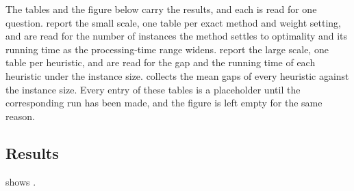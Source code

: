 \documentclass[12pt]{article}
\let\origsubsection\subsection
\renewcommand{\subsection}{\FloatBarrier\origsubsection}
\begin{document}
\begin{sloppypar}
The tables and the figure below carry the results, and each is read for one question.
 report the small
scale, one table per exact method and weight setting, and are read for the number
of instances the method settles to optimality and its running time as the processing-time range
widens.  report the large
scale, one table per heuristic, and are read for the gap and the running time of each
heuristic under the instance size.  collects the mean gaps
of every heuristic against the instance size. Every entry of these tables is a placeholder
until the corresponding run has been made, and the figure is left empty for the same reason.

\subsection{Results}



 shows \TBD.


\end{sloppypar}
\end{document}
